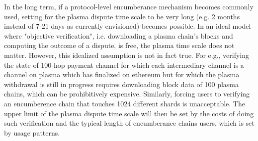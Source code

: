 \documentclass{article}
\begin{document}
In the long term, if a protocol-level encumberance mechanism becomes commonly used, setting for the plasma dispute time scale to be very long (e.g. 2 months instead of 7-21 days as currently envisioned) becomes possible. In an ideal model where "objective verification", i.e. downloading a plasma chain's blocks and computing the outcome of a dispute, is free, the plasma time scale does not matter. However, this idealized assumption is not in fact true. For e.g., verifying the state of 100-hop payment channel for which each intermediary channel is a channel on plasma which has finalized on ethereum but for which the plasma withdrawal is still in progress requires downloading block data of 100 plasma chains, which can be prohibitively expensive. Similarly, forcing users to verifying an encumberence chain that touches 1024 different shards is unacceptable.
The upper limit of the plasma dispute time scale will then be set by the costs of doing such verification and the typical length of encumberance chains users, which is set by usage patterns.
\end{document}
